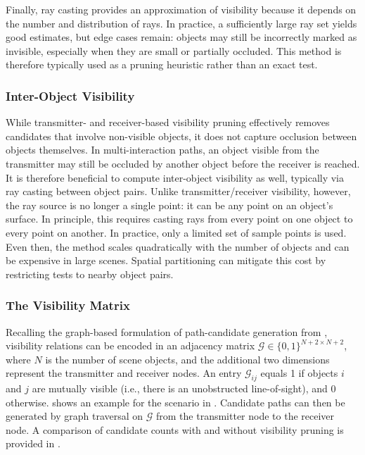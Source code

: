Finally, ray casting provides an approximation of visibility because it depends on the number and distribution of rays. In practice, a sufficiently large ray set yields good estimates, but edge cases remain: objects may still be incorrectly marked as invisible, especially when they are small or partially occluded. This method is therefore typically used as a pruning heuristic rather than an exact test.

\subsubsection{Inter-Object Visibility}

While transmitter- and receiver-based visibility pruning effectively removes candidates that involve non-visible objects, it does not capture occlusion between objects themselves. In multi-interaction paths, an object visible from the transmitter may still be occluded by another object before the receiver is reached. It is therefore beneficial to compute inter-object visibility as well, typically via ray casting between object pairs. Unlike transmitter/receiver visibility, however, the ray source is no longer a single point: it can be any point on an object's surface. In principle, this requires casting rays from every point on one object to every point on another. In practice, only a limited set of sample points is used. Even then, the method scales quadratically with the number of objects and can be expensive in large scenes. Spatial partitioning can mitigate this cost by restricting tests to nearby object pairs.

\subsubsection{The Visibility Matrix}

Recalling the graph-based formulation of path-candidate generation from , visibility relations can be encoded in an adjacency matrix $\mathcal{G} \in \{0,1\}^{N+2 \times N+2}$, where $N$ is the number of scene objects, and the additional two dimensions represent the transmitter and receiver nodes. An entry $\mathcal{G}_{ij}$ equals 1 if objects $i$ and $j$ are mutually visible (i.e., there is an unobstructed \gls{line-of-sight}), and 0 otherwise.  shows an example for the scenario in . Candidate paths can then be generated by graph traversal on $\mathcal{G}$ from the transmitter node to the receiver node. A comparison of candidate counts with and without visibility pruning is provided in .

